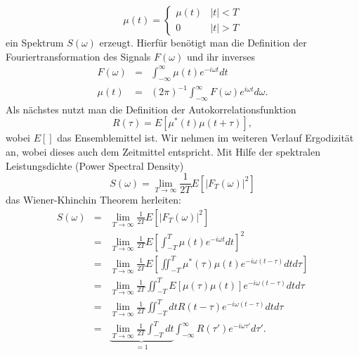 \documentclass[a4paper,12pt]{article}
\begin{document}
  \begin{equation}
   \mu(t) = \left\{ 
         \begin{matrix}
          \mu(t) &  |t| < T\\
               0 &  |t| > T
         \end{matrix} 
         \right .
  \end{equation}
ein Spektrum $S(\omega)$ erzeugt. Hierfür benötigt man die Definition der Fouriertransformation des Signals $F(\omega)$ und ihr inverses 
  \begin{eqnarray}
   F(\omega)&=&             \int_{-\infty}^{\infty} \mu(t) e^{-i\omega t} dt\\
   \mu(t)   &=& (2\pi)^{-1} \int_{-\infty}^{\infty} F(\omega) e^{i\omega t} d\omega.
  \end{eqnarray}
Als nächstes nutzt man die Definition der Autokorrelationsfunktion 
  \begin{equation}
   R(\tau)=E[\mu^*(t) \mu(t+\tau)],
  \end{equation}
wobei $E[]$ das Ensemblemittel ist. Wir nehmen im weiteren Verlauf Ergodizität an, wobei dieses auch dem Zeitmittel entspricht. 
Mit Hilfe der spektralen Leistungsdichte (Power Spectral Density) 
  \begin{equation}\label{preKWT}
   S(\omega) = \lim_{T\rightarrow\infty} \frac{1}{2T} E[|F_T(\omega)|^2]
  \end{equation}
das Wiener-Khinchin Theorem herleiten:
  \begin{eqnarray}
      S(\omega)          &=& \lim_{T\rightarrow\infty} \frac{1}{2T} E[|F_T(\omega)|^2]\nonumber\\
                         &=& \lim_{T\rightarrow\infty} \frac{1}{2T}E\left[ \int_{-T}^T \mu(t) e^{-i\omega t} dt \right]^2  \nonumber\\
                         &=& \lim_{T\rightarrow\infty} \frac{1}{2T}E\left[ \iint_{-T}^T \mu^*(\tau)\mu(t) e^{-i\omega (t-\tau)}  dtd\tau \right]  \nonumber\\     
                         &=& \lim_{T\rightarrow\infty} \frac{1}{2T}        \iint_{-T}^T E[\mu(\tau)\mu(t)] e^{-i\omega (t-\tau)}  dtd\tau       \nonumber \\
                         &=& \lim_{T\rightarrow\infty} \frac{1}{2T} \iint_{-T}^T dt R(t-\tau) e^{-i\omega(t-\tau)} dtd\tau       \nonumber \\
                         &=&\underbrace{ \lim_{T\rightarrow\infty} \frac{1}{2T} \int_{-T}^T dt}_{=1} \int_{-\infty}^{\infty} R(\tau') e^{-i\omega\tau'} d\tau'. \label{WKT_tmp} 
  \end{eqnarray}
\end{document}
